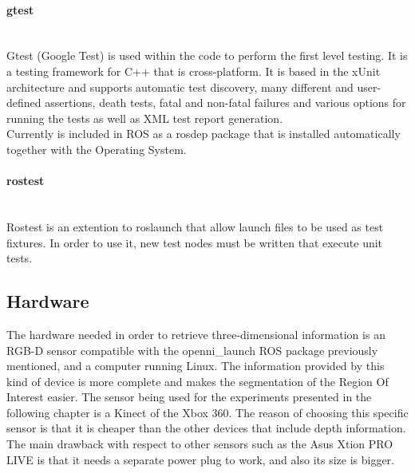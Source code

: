 		\paragraph{gtest}\mbox{} \\

		\label{gtest}
		Gtest (Google Test) is used within the code to perform the first level testing. It is a testing framework for C++ that is cross-platform. It is based in the xUnit architecture and supports automatic test discovery, many different and user-defined assertions, death tests, fatal and non-fatal failures and various options for running the tests as well as XML test report generation. 
		\\

		Currently is included in ROS as a rosdep package that is installed automatically together with the Operating System. 


		\paragraph{rostest}\mbox{} \\

		\label{rostest}
		Rostest is an extention to roslaunch that allow launch files to be used as test fixtures. 
		In order to use it, new test nodes must be written that execute unit tests. 


	\subsection{Hardware}
		\label{technologies_hardware}

		The hardware needed in order to retrieve three-dimensional information is an RGB-D sensor compatible with the openni\_launch ROS package previously mentioned, and a computer running Linux. The information provided by this kind of device is more complete and makes the segmentation of the Region Of Interest easier. 
		The sensor being used for the experiments presented in the following chapter is a Kinect of the Xbox 360. The reason of choosing this specific sensor is that it is cheaper than the other devices that include depth information. The main drawback with respect to other sensors such as the Asus Xtion PRO LIVE\cite{xtion} is that it needs a separate power plug to work, and also its size is bigger. 
		\\



